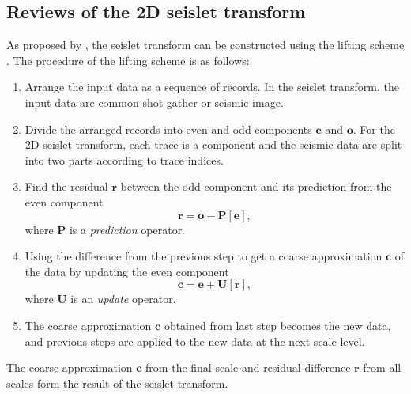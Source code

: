 \subsection{Reviews of the 2D seislet transform}
    As proposed by \cite{fomel2010seislet}, the seislet transform can be 
    constructed using the lifting scheme \cite[]{sweldens1995lifting}. 
    The procedure of the lifting scheme is as follows:
    \begin{enumerate}
        \item Arrange the input data as a sequence of records. 
            In the seislet transform, the input data are common shot gather or 
            seismic image.
        \item Divide the arranged records into even and odd components 
            $\mathbf{e}$ and $\mathbf{o}$. For the 2D seislet transform, each 
            trace is a component and the seismic data are split into two parts 
            according to trace indices.
        \item Find the residual $\mathbf{r}$ between the odd component and 
            its prediction from the even component
            \begin{equation}
                \mathbf{r} = \mathbf{o} - \mathbf{P[e]},
                \label{eq:a}
            \end{equation}
            where $\mathbf{P}$ is a \emph{prediction} operator.
        \item Using the difference from the previous step to get a coarse 
            approximation $\mathbf{c}$ of the data by updating the even 
            component
            \begin{equation}
                \mathbf{c} = \mathbf{e} + \mathbf{U[r]},
                \label{eq:b}
            \end{equation}
            where $\mathbf{U}$ is an \emph{update} operator.
        \item The coarse approximation $\mathbf{c}$ obtained from last step 
            becomes the new data, and previous steps are applied to the new data 
            at the next scale level.
    \end{enumerate}

    The coarse approximation $\mathbf{c}$ from the final scale and residual
    difference $\mathbf{r}$ from all scales form the result of the seislet 
    transform.

